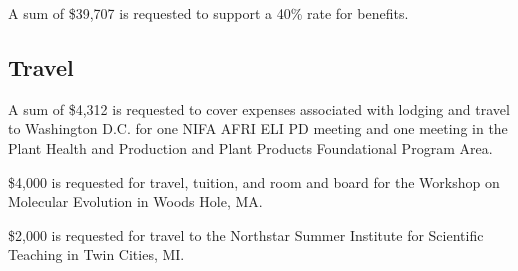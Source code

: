 \documentclass[12pt,letterpaper]{article}
\begin{document}
A sum of \$39,707 is requested to support a 40\% rate for benefits.

\subsection{Travel}

A sum of \$4,312 is requested to cover expenses associated with lodging and travel to Washington D.C. for one NIFA AFRI ELI PD meeting and one meeting in the Plant Health and Production and Plant Products Foundational Program Area.

\$4,000 is requested for travel, tuition, and room and board for the Workshop on Molecular Evolution in Woods Hole, MA.

\$2,000 is requested for travel to the Northstar Summer Institute for Scientific Teaching in Twin Cities, MI.
\end{document}
